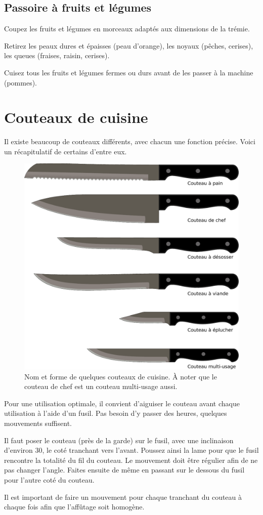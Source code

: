 \documentclass[a4paper,twoside,openright]{report}
\begin{document}
\subsection{Passoire à fruits et légumes}
Coupez les fruits et légumes en morceaux adaptés aux dimensions de la trémie. 

Retirez les peaux dures et épaisses (peau d'orange), les noyaux (pêches, cerises), les queues (fraises, raisin, cerises).

Cuisez tous les fruits et légumes fermes ou durs avant de les passer à la machine (pommes).

\section{Couteaux de cuisine}
Il existe beaucoup de couteaux différents, avec chacun une fonction précise. Voici un récapitulatif de certains d'entre eux.

\begin{figure}[htb]
\centering
\includegraphics[width=0.6\linewidth]{figures/couteaux.pdf}
\caption{Nom et forme de quelques couteaux de cuisine. À noter que le couteau de chef est un couteau multi-usage aussi.}
\end{figure}

\begin{remarque}
Pour une utilisation optimale, il convient d'aiguiser le couteau avant chaque utilisation à l'aide d'un fusil. Pas besoin d'y passer des heures, quelques mouvements suffisent.

Il faut poser le couteau (près de la garde) sur le fusil, avec une inclinaison d'environ 30\degre, le coté tranchant vers l'avant. Poussez ainsi la lame pour que le fusil rencontre la totalité du fil du couteau. Le mouvement doit être régulier afin de ne pas changer l'angle. Faites ensuite de même en passant sur le dessous du fusil pour l'autre coté du couteau.

Il est important de faire un mouvement pour chaque tranchant du couteau à chaque fois afin que l'affûtage soit homogène.
\end{remarque}
\end{document}

